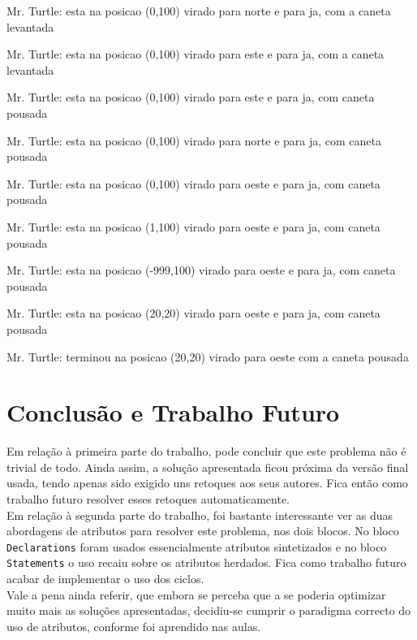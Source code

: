 \documentclass[11pt,a4paper]{article}
\begin{document}
\begin{code_txt}
Mr. Turtle:
esta na posicao (0,100)
virado para norte
e para ja, com a caneta levantada

Mr. Turtle:
esta na posicao (0,100)
virado para este
e para ja, com a caneta levantada

Mr. Turtle:
esta na posicao (0,100)
virado para este
e para ja, com caneta pousada

Mr. Turtle:
esta na posicao (0,100)
virado para norte
e para ja, com caneta pousada

Mr. Turtle:
esta na posicao (0,100)
virado para oeste
e para ja, com caneta pousada

Mr. Turtle:
esta na posicao (1,100)
virado para oeste
e para ja, com caneta pousada

Mr. Turtle:
esta na posicao (-999,100)
virado para oeste
e para ja, com caneta pousada

Mr. Turtle:
esta na posicao (20,20)
virado para oeste
e para ja, com caneta pousada

Mr. Turtle:
terminou na posicao (20,20)
virado para oeste
com a caneta pousada 
\end{code_txt}

\newpage
\section{Conclusão e Trabalho Futuro}
Em relação à primeira parte do trabalho, pode concluir que este problema não é trivial de todo. Ainda assim, a solução apresentada ficou próxima da versão final usada, tendo apenas sido 
exigido uns retoques aos seus autores. Fica então como trabalho futuro resolver esses retoques automaticamente.\\

Em relação à segunda parte do trabalho, foi bastante interessante ver as duas abordagens de atributos para resolver este problema, nos dois blocos. No bloco \texttt{Declarations} foram 
usados essencialmente atributos sintetizados e no bloco \texttt{Statements} o uso recaiu sobre os atributos herdados. Fica como trabalho futuro acabar de implementar o uso dos ciclos.\\

Vale a pena ainda referir, que embora se perceba que a se poderia optimizar muito mais as soluções apresentadas, decidiu-se cumprir o paradigma correcto do uso de atributos, conforme 
foi aprendido nas aulas.
\end{document}
